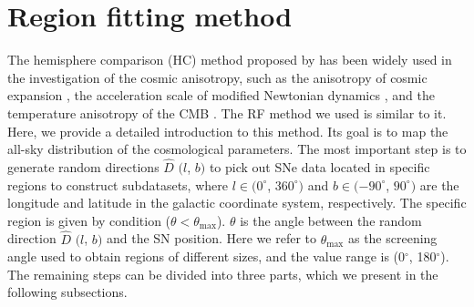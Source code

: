\documentclass{aa}
\begin{document}
\section{Region fitting method}
The hemisphere comparison (HC) method proposed by \citet{2007AA...474..717S} has been widely used in the investigation of the cosmic anisotropy, such as the anisotropy of cosmic expansion \citep{2018EPJC...78..755D,2022MNRAS.511.5661Z}, the acceleration scale of modified Newtonian dynamics \citep{2017ApJ...847...86Z,2018ChPhC..42k5103C,2019MNRAS.486.1658C}, and the temperature anisotropy of the CMB \citep{2004MNRAS.354..641H,2013ApJS..208...20B,2016JCAP...01..046G,2021PhRvD.104f3503F}. The RF method we used is similar to it. Here, we provide a detailed introduction to this method. Its goal is to map the all-sky distribution of the cosmological parameters. The most important step is to generate random directions $\hat{D}$ $(l$, $b)$ to pick out SNe data located in specific regions to construct subdatasets, where $l\in(0^{\circ}$, $360^{\circ})$ and $b\in(-90^{\circ}$, $90^{\circ})$ are the longitude and latitude in the galactic coordinate system, respectively. The specific region is given by condition ($\theta < \theta_\mathrm{max}$). $\theta$ is the angle between the random direction $\hat{D}$ $(l$, $b)$ and the SN position. Here we refer to $\theta_\mathrm{max}$ as the screening angle used to obtain regions of different sizes, and the value range is (0$^{\circ}$, 180$^{\circ}$). The remaining steps can be divided into three parts, which we present in the following subsections.
 
 
\end{document}

